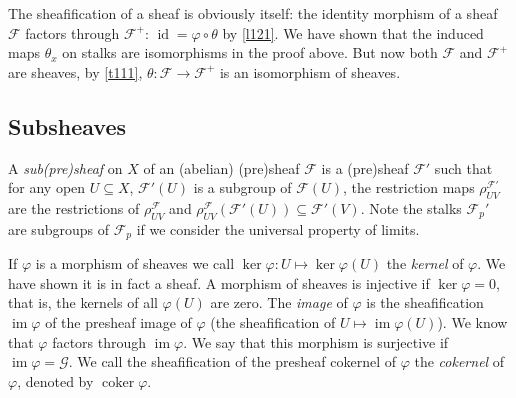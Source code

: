\documentclass[12pt]{article}
\theoremstyle{remark}
\newcommand{\coker}[0]{\operatorname{coker}}
\newcommand{\im}[0]{\operatorname{im}}
\newcommand{\id}[0]{\operatorname{id}}
\begin{document}
	The sheafification of a sheaf is obviously itself: the identity morphism of a sheaf $\mathscr F$ factors through $\mathscr F^+$: $\id = \varphi\circ \theta$ by \autoref{l121}. We have shown that the induced maps $\theta_x$ on stalks are isomorphisms in the proof above. But now both $\mathscr F$ and $\mathscr F^+$ are sheaves, by \autoref{t111}, $\theta:\mathscr F\to\mathscr F^+$ is an isomorphism of sheaves. 
	\subsection{Subsheaves}\label{ssec-subsheaf}
	A \textit{sub(pre)sheaf} on $X$ of an (abelian) (pre)sheaf $\mathscr F$ is a (pre)sheaf $\mathscr F'$ such that for any open $U\subseteq X$, $\mathscr F'(U)$ is a subgroup of $\mathscr F(U)$, the restriction maps $\rho_{UV}^{\mathscr F'}$ are the restrictions of $\rho_{UV}^{\mathscr F}$ and $\rho_{UV}^{\mathscr F}(\mathscr F'(U))\subseteq \mathscr F'(V)$. Note the stalks $\mathscr F_p'$ are subgroups of $\mathscr F_p$ if we consider the universal property of limits.
	
	If $\varphi$ is a morphism of sheaves we call $\ker\varphi:U\mapsto \ker\varphi(U)$ the \textit{kernel} of $\varphi$. We have shown it is in fact a sheaf. A morphism of sheaves is injective if $\ker\varphi=0$, that is, the kernels of all $\varphi(U)$ are zero. The \textit{image} of $\varphi$ is the sheafification $\im\varphi$ of the presheaf image of $\varphi$ (the sheafification of $U\mapsto \im \varphi(U)$). We know that $\varphi$ factors through $\im\varphi$. We say that this morphism is surjective if $\im\varphi=\mathscr G$. We call the sheafification of the presheaf cokernel of $\varphi$ the \textit{cokernel} of $\varphi$, denoted by $\coker\varphi$.
	
\end{document}
